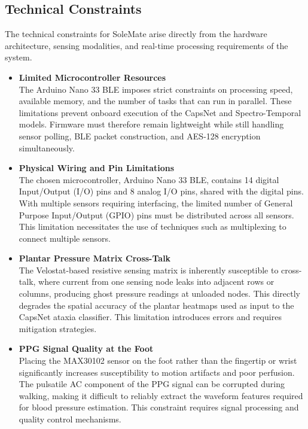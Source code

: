 \subsection{Technical Constraints}
The technical constraints for SoleMate arise directly from the hardware architecture, sensing modalities, and real-time processing requirements of the system.\\

\begin{itemize}
    \item \textbf{Limited Microcontroller Resources}\\
    The Arduino Nano 33 BLE imposes strict constraints on processing speed, available memory, and the number of tasks that can run in parallel. These limitations prevent onboard execution of the CapsNet and Spectro-Temporal models. Firmware must therefore remain lightweight while still handling sensor polling, BLE packet construction, and AES-128 encryption simultaneously.
    \item  \textbf{Physical Wiring and Pin Limitations}\\
    The chosen microcontroller, Arduino Nano 33 BLE, contains 14 digital Input/Output (I/O) pins and 8 analog I/O pins, shared with the digital pins. With multiple sensors requiring interfacing, the limited number of General Purpose Input/Output (GPIO) pins must be distributed across all sensors. This limitation necessitates the use of techniques such as multiplexing to connect multiple sensors.
    \item \textbf{Plantar Pressure Matrix Cross-Talk}\\
    The Velostat-based resistive sensing matrix is inherently susceptible to cross-talk, where current from one sensing node leaks into adjacent rows or columns, producing ghost pressure readings at unloaded nodes. This directly degrades the spatial accuracy of the plantar heatmaps used as input to the CapsNet ataxia classifier. This limitation introduces errors and requires mitigation strategies.
    \item \textbf{PPG Signal Quality at the Foot}\\
    Placing the MAX30102 sensor on the foot rather than the fingertip or wrist significantly increases susceptibility to motion artifacts and poor perfusion. The pulsatile AC component of the PPG signal can be corrupted during walking, making it difficult to reliably extract the waveform features required for blood pressure estimation. This constraint requires signal processing and quality control mechanisms. 

\end{itemize}
